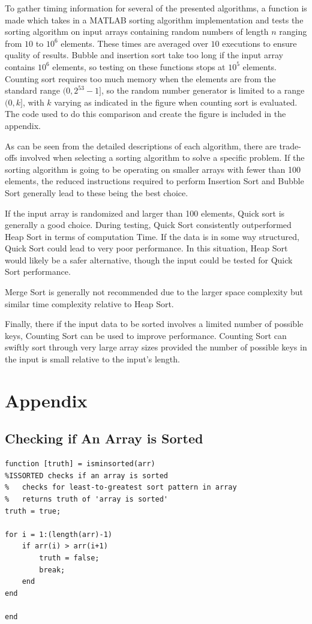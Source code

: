 \documentclass[a4paper]{article}
\begin{document}
To gather timing information for several of the presented algorithms, a function is made which takes in a MATLAB sorting algorithm implementation and tests the sorting algorithm on input arrays containing random numbers of length $n$ ranging from $10$ to $10^6$ elements. These times are averaged over $10$ executions to ensure quality of results. Bubble and insertion sort take too long if the input array contains $10^6$ elements, so testing on these functions stops at $10^5$ elements. Counting sort requires too much memory when the elements are from the standard range $(0, 2^{53}-1]$, so the random number generator is limited to a range $(0, k]$, with $k$ varying as indicated in the figure when counting sort is evaluated. The code used to do this comparison and create the figure is included in the appendix.

As can be seen from the detailed descriptions of each algorithm, there are trade-offs involved when selecting a sorting algorithm to solve a specific problem. If the sorting algorithm is going to be operating on smaller arrays with fewer than 100 elements, the reduced instructions required to perform Insertion Sort and Bubble Sort generally lead to these being the best choice.

If the input array is randomized and larger than 100 elements, Quick sort is generally a good choice. During testing, Quick Sort consistently outperformed Heap Sort in terms of computation Time. If the data is in some way structured, Quick Sort could lead to very poor performance. In this situation, Heap Sort would likely be a safer alternative, though the input could be tested for Quick Sort performance. 

Merge Sort is generally not recommended due to the larger space complexity but similar time complexity relative to Heap Sort.

Finally, there if the input data to be sorted involves a limited number of possible keys, Counting Sort can be used to improve performance. Counting Sort can swiftly sort through very large array sizes provided the number of possible keys in the input is small relative to the input’s length.

\section{Appendix}
\subsection{Checking if An Array is Sorted}
\begin{lstlisting}
function [truth] = isminsorted(arr)
%ISSORTED checks if an array is sorted
%   checks for least-to-greatest sort pattern in array
%   returns truth of 'array is sorted'
truth = true;

for i = 1:(length(arr)-1)
    if arr(i) > arr(i+1)
        truth = false;
        break;
    end
end

end
\end{lstlisting}
\end{document}

